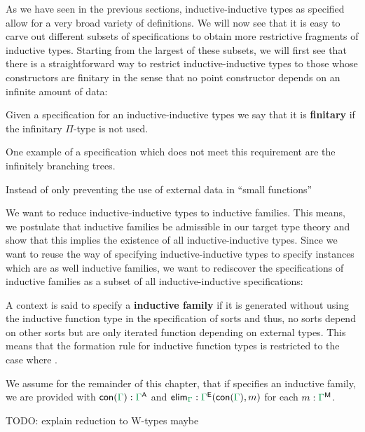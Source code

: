 As we have seen in the previous sections, inductive-inductive types as specified
allow for a very broad variety of definitions.
We will now see that it is easy to carve out different subsets of specifications
to obtain more restrictive fragments of inductive types.
Starting from the largest of these subsets, we will first see that there is a
straightforward way to restrict inductive-inductive types to those whose constructors
are finitary in the sense that no point constructor depends on an infinite
amount of data: %

\begin{defn}
Given a specification \grm{\Gamma} for an inductive-inductive types we say that
it is \textbf{finitary} if the infinitary $\Pi$-type is not used.
\end{defn}

One example of a specification which does not meet this requirement are the
infinitely branching trees. %

Instead of only preventing the use of external data in ``small functions''

We want to reduce inductive-inductive types to inductive families.
This means, we postulate that inductive families be admissible in our target
type theory and show that this implies the existence of all inductive-inductive
types.
Since we want to reuse the way of specifying inductive-inductive types to specify
instances which are as well inductive families, we want to rediscover the specifications
of inductive families as a subset of all inductive-inductive specifications:

\begin{defn}
A context \grm{\Gamma} is said to specify a \textbf{inductive family} if it is
generated without using the inductive function type in the specification of sorts
and thus, no sorts depend on other sorts but are only iterated function depending
on external types.
This means that the formation rule for inductive function types is restricted
to the case where .
\end{defn}

We assume for the remainder of this chapter, that if \grm{\Gamma} specifies an
inductive family, we are provided with $\con{\Gamma} : \grm{\Gamma}^\CC$ and
$\elim_\grm{\Gamma} : \grm{\Gamma}^\EE(\con{\Gamma}, m)$ for each
$m : \grm{\Gamma}^\MM$.

TODO: explain reduction to W-types maybe

